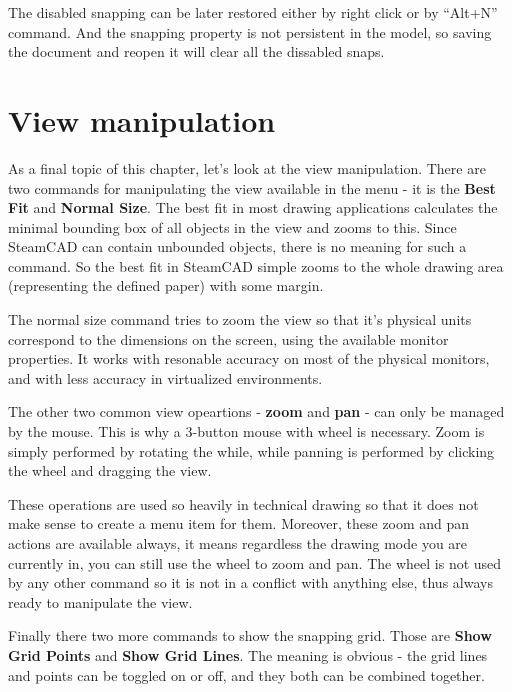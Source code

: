 The disabled snapping can be later restored either by right click or by ``Alt+N'' command.
And the snapping property is not persistent in the model, so saving the document and reopen
it will clear all the dissabled snaps.

\section{View manipulation}

As a final topic of this chapter, let's look at the view manipulation. There are two commands
for manipulating the view available in the menu - it is the \textbf{Best Fit} and
\textbf{Normal Size}. The best fit in most drawing applications calculates the minimal bounding
box of all objects in the view and zooms to this. Since SteamCAD can contain unbounded objects,
there is no meaning for such a command. So the best fit in SteamCAD simple zooms to the whole
drawing area (representing the defined paper) with some margin.

The normal size command tries to zoom the view so that it's physical units correspond to the
dimensions on the screen, using the available monitor properties. It works with resonable
accuracy on most of the physical monitors, and with less accuracy in virtualized environments.

The other two common view opeartions - \textbf{zoom} and \textbf{pan} - can only be managed
by the mouse. This is why a 3-button mouse with wheel is necessary. Zoom is simply performed
by rotating the while, while panning is performed by clicking the wheel and dragging the view.

These operations are used so heavily in technical drawing so that it does not make sense
to create a menu item for them. Moreover, these zoom and pan actions are available always,
it means regardless the drawing mode you are currently in, you can still use the wheel
to zoom and pan. The wheel is not used by any other command so it is not in a conflict
with anything else, thus always ready to manipulate the view.

Finally there two more commands to show the snapping grid. Those are \textbf{Show Grid Points}
and \textbf{Show Grid Lines}. The meaning is obvious - the grid lines and points can be toggled
on or off, and they both can be combined together.
